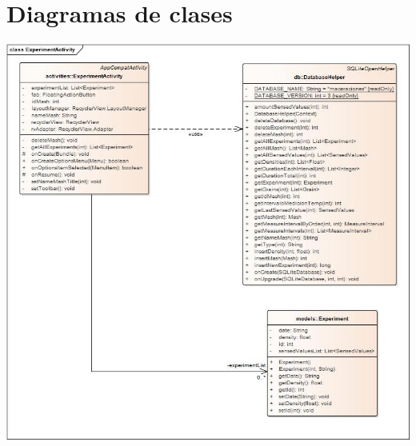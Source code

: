     \begin{minipage}{0.95\textwidth}
\chapter{Diagramas de clases}
        \centering
        \includegraphics[scale=0.55, angle=90]{Anexo/DiagramasClase/ExperimentActivity.jpg}
        \label{fig:DiagClaseExperimentActivity}
    \end{minipage}
    
